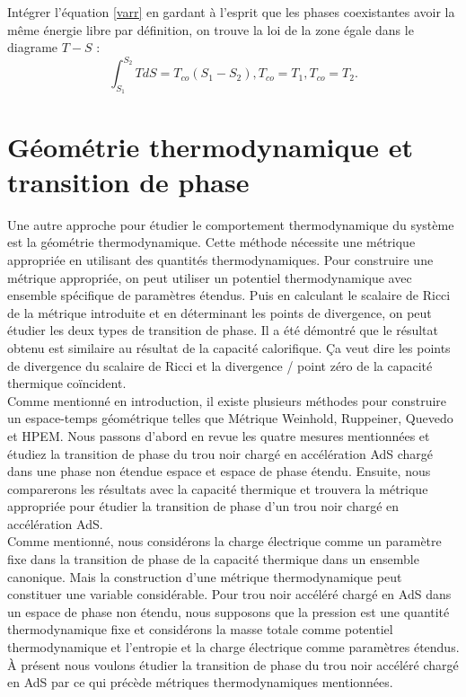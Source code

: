 \documentclass[12pt,  a4paper, openright]{report} %
\begin{document}
Intégrer l’équation \ref{varr} en gardant à l’esprit que les phases coexistantes avoir la même énergie libre par définition, on trouve la loi de la zone égale dans le diagrame $T-S$  \cite{23,24}:
\begin{equation}
\int_{S_1}^{S_2} TdS=T_{co}(S_{1} - S_{2}),
T_{co}=T_{1},
T_{co}=T_{2}.
\end{equation}

\section{Géométrie thermodynamique et transition de phase}
Une autre approche pour étudier le comportement thermodynamique du système est la géométrie thermodynamique. Cette méthode nécessite une métrique appropriée en utilisant des quantités thermodynamiques. Pour construire une métrique appropriée, on peut utiliser un potentiel thermodynamique avec
ensemble spécifique de paramètres étendus. Puis en calculant le scalaire de Ricci de la métrique introduite
et en déterminant les points de divergence, on peut étudier les deux types de transition de phase. Il
a été démontré que le résultat obtenu est similaire au résultat de la capacité calorifique. Ça veut dire
les points de divergence du scalaire de Ricci et la divergence / point zéro de la capacité thermique coïncident.\\
Comme mentionné en introduction, il existe plusieurs méthodes pour construire un espace-temps géométrique telles que
Métrique Weinhold, Ruppeiner, Quevedo et HPEM. Nous passons d'abord en revue les quatre mesures mentionnées
et étudiez la transition de phase du trou noir chargé en accélération AdS chargé dans une phase non étendue
espace et espace de phase étendu. Ensuite, nous comparerons les résultats avec la capacité thermique et
trouvera la métrique appropriée pour étudier la transition de phase d'un trou noir chargé en accélération AdS.\\
Comme mentionné, nous considérons la charge électrique comme un paramètre fixe dans la transition de phase
de la capacité thermique dans un ensemble canonique. Mais la construction d'une métrique thermodynamique peut constituer une variable considérable. Pour trou noir accéléré chargé en AdS dans un espace de phase non étendu,
nous supposons que la pression est une quantité thermodynamique fixe et considérons la masse totale comme
potentiel thermodynamique et l'entropie et la charge électrique comme paramètres étendus. À présent
nous voulons étudier la transition de phase du trou noir accéléré chargé en AdS par ce qui précède
métriques thermodynamiques mentionnées.
\end{document}
